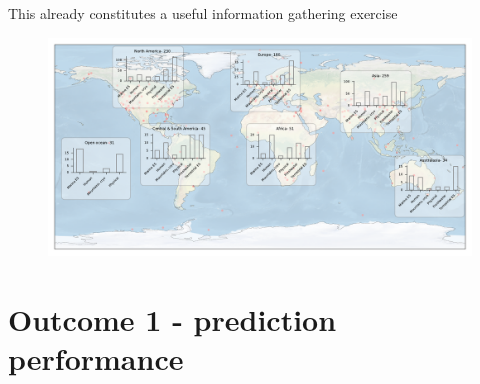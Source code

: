 \documentclass[9pt]{beamer}
\begin{document}
\begin{frame}{This already constitutes a useful information gathering exercise}

\begin{figure}
	\includegraphics[width=\linewidth]{../plots/map_coded.pdf}
\end{figure}

\end{frame}

\section{Outcome 1 - prediction performance}
\begin{frame}
\tableofcontents[currentsection]
\end{frame}

%
%
%
%		
\end{document}
